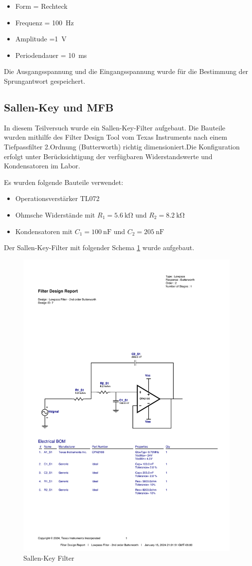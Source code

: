 \begin{itemize}
    \item Form = Rechteck 
    \item Frequenz = \SI{100}{\hertz}
    \item Amplitude =\SI{1}{\volt}
    \item Periodendauer = \SI{10}{\milli\second}
\end{itemize}

Die Ausgangsspannung und die Eingangsspannung wurde für die Bestimmung der Sprungantwort gespeichert.


\subsection{Sallen-Key und MFB}

In diesem Teilversuch wurde ein Sallen-Key-Filter aufgebaut. Die Bauteile wurden mithilfe des Filter Design Tool vom Texas Instruments \cite{Texas_Instruments} nach einem Tiefpassfilter 2.Ordnung (Butterworth) richtig dimensioniert.Die Konfiguration erfolgt unter Berücksichtigung der verfügbaren Widerstandswerte und Kondensatoren im Labor.

Es wurden folgende Bauteile verwendet:
%
\begin{itemize}
    \item Operationsverstärker TL072
    \item Ohmsche Widerstände mit $R_1=\SI{5,6}{\kilo\ohm}$ und $R_2=\SI{8,2}{\kilo\ohm}$
    \item Kondensatoren mit $C_1=\SI{100}{\nano\farad}$ und $C_2=\SI{205}{\nano\farad}$
\end{itemize}

Der Sallen-Key-Filter mit folgender Schema \ref{fig:Sallenkey_circuit} wurde aufgebaut.

\begin{figure}[H]
  \centering
  \includegraphics[width=0.5\linewidth]{Elektronik-Laborprotokoll_Filter/Circuits/SallenKey_Design.pdf}
  \caption{Sallen-Key Filter}
  \label{fig:Sallenkey_circuit}
\end{figure}

